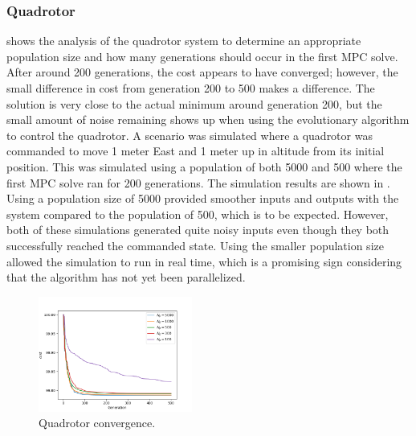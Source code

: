 \documentclass[letterpaper, 10 pt, conference]{ieeeconf}  %
\begin{document}
	\subsubsection{Quadrotor}
	
	 shows the analysis of the quadrotor system to determine an appropriate population size and how many generations should occur in the first MPC solve. After around 200 generations, the cost appears to have converged; however, the small difference in cost from generation 200 to 500 makes a difference. The solution is very close to the actual minimum around generation 200, but the small amount of noise remaining shows up when using the evolutionary algorithm to control the quadrotor. A scenario was simulated where a quadrotor was commanded to move 1 meter East and 1 meter up in altitude from its initial position. This was simulated using a population of both 5000 and 500 where the first MPC solve ran for 200 generations. The simulation results are shown in . Using a population size of 5000 provided smoother inputs and outputs with the system compared to the population of 500, which is to be expected. However, both of these simulations generated quite noisy inputs even though they both successfully reached the commanded state. Using the smaller population size allowed the simulation to run in real time, which is a promising sign considering that the algorithm has not yet been parallelized.
	
	\begin{figure}[htbp]
		\centering
		\includegraphics[width=0.45\textwidth]{figures/quadrotor_convergence.png}
		\caption{Quadrotor convergence.}
		\label{fig:quad_convergence}
	\end{figure}
	
\end{document}

